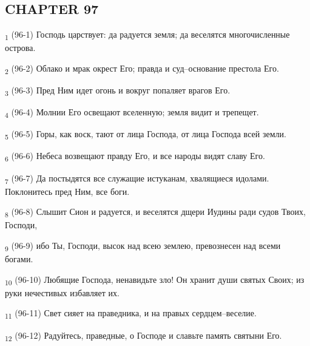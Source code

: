 \subsection{CHAPTER 97}
\begin{tcolorbox}
\textsubscript{1} (96-1) Господь царствует: да радуется земля; да веселятся многочисленные острова.
\end{tcolorbox}
\begin{tcolorbox}
\textsubscript{2} (96-2) Облако и мрак окрест Его; правда и суд--основание престола Его.
\end{tcolorbox}
\begin{tcolorbox}
\textsubscript{3} (96-3) Пред Ним идет огонь и вокруг попаляет врагов Его.
\end{tcolorbox}
\begin{tcolorbox}
\textsubscript{4} (96-4) Молнии Его освещают вселенную; земля видит и трепещет.
\end{tcolorbox}
\begin{tcolorbox}
\textsubscript{5} (96-5) Горы, как воск, тают от лица Господа, от лица Господа всей земли.
\end{tcolorbox}
\begin{tcolorbox}
\textsubscript{6} (96-6) Небеса возвещают правду Его, и все народы видят славу Его.
\end{tcolorbox}
\begin{tcolorbox}
\textsubscript{7} (96-7) Да постыдятся все служащие истуканам, хвалящиеся идолами. Поклонитесь пред Ним, все боги.
\end{tcolorbox}
\begin{tcolorbox}
\textsubscript{8} (96-8) Слышит Сион и радуется, и веселятся дщери Иудины ради судов Твоих, Господи,
\end{tcolorbox}
\begin{tcolorbox}
\textsubscript{9} (96-9) ибо Ты, Господи, высок над всею землею, превознесен над всеми богами.
\end{tcolorbox}
\begin{tcolorbox}
\textsubscript{10} (96-10) Любящие Господа, ненавидьте зло! Он хранит души святых Своих; из руки нечестивых избавляет их.
\end{tcolorbox}
\begin{tcolorbox}
\textsubscript{11} (96-11) Свет сияет на праведника, и на правых сердцем--веселие.
\end{tcolorbox}
\begin{tcolorbox}
\textsubscript{12} (96-12) Радуйтесь, праведные, о Господе и славьте память святыни Его.
\end{tcolorbox}
